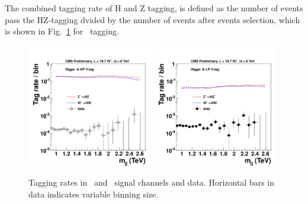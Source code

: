 The combined tagging rate of H and Z tagging, is defined as the number of 
events pass the HZ-tagging dvided by the number of events after events
selection, which is shown in Fig.~\ref{fig:HbbZqqOverallEff} for \HbbZqq\ 
tagging. 

\begin{figure}[htb]
\begin{center}
\includegraphics[width=0.49\textwidth]{EXO-14-009/HbbZqqfigs/Signal/HbbVqq-signal-taggingEff-8TeV.pdf}
\includegraphics[width=0.49\textwidth]{EXO-14-009/HbbZqqfigs/Signal/HbbVqq-signal-taggingEff-LowV-8TeV.pdf}
\end{center}
\caption{
Tagging rates in \HbbZqq\ and \HbbWqq\ signal channels and data. Horizontal bars
in data indicates variable binning size.
}
\label{fig:HbbZqqOverallEff}
\end{figure}




